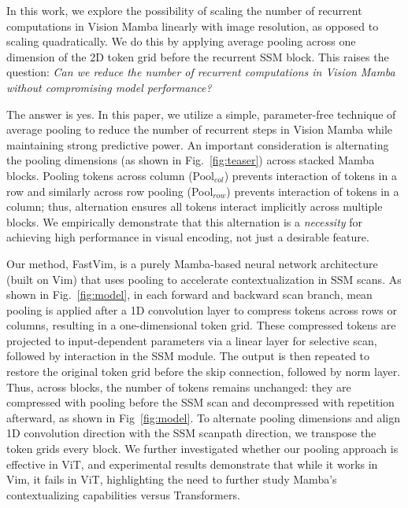 In this work, we explore the possibility of scaling the number of recurrent computations in Vision Mamba linearly with image resolution, as opposed to scaling quadratically. We do this by applying average pooling across one dimension of the 2D token grid before the recurrent SSM block. This raises the question: \textit{Can we reduce the number of recurrent computations in Vision Mamba without compromising model performance?}

The answer is yes. In this paper, we utilize a simple, parameter-free technique of average pooling to reduce the number of recurrent steps in Vision Mamba while maintaining strong predictive power. 
An important consideration is alternating the pooling dimensions (as shown in Fig.~\ref{fig:teaser}) across stacked Mamba blocks. Pooling tokens across column (Pool$_{col}$) prevents interaction of tokens in a row and similarly across row pooling (Pool$_{row}$) prevents interaction of tokens in a column; thus, alternation ensures all tokens interact implicitly across multiple blocks. We empirically demonstrate that this alternation is a \textit{necessity} for achieving high performance in visual encoding, not just a desirable feature.

Our method, FastVim, is a purely Mamba-based neural network architecture (built on Vim) that uses pooling to accelerate contextualization in SSM scans. As shown in Fig.~\ref{fig:model}, in each forward and backward scan branch, mean pooling is applied after a 1D convolution layer to compress tokens across rows or columns, resulting in a one-dimensional token grid. These compressed tokens are projected to input-dependent parameters via a linear layer for selective scan, followed by interaction in the SSM module. The output is then repeated to restore the original token grid before the skip connection, followed by norm layer. Thus, across blocks, the number of tokens remains unchanged: they are compressed with pooling before the SSM scan and decompressed with repetition afterward, as shown in Fig~\ref{fig:model}. To alternate pooling dimensions and align 1D convolution direction with the SSM scanpath direction, we transpose the token grids every block. We further investigated whether our pooling approach is effective in ViT, and experimental results demonstrate that while it works in Vim, it fails in ViT, highlighting the need to further study Mamba's contextualizing capabilities versus Transformers. 

